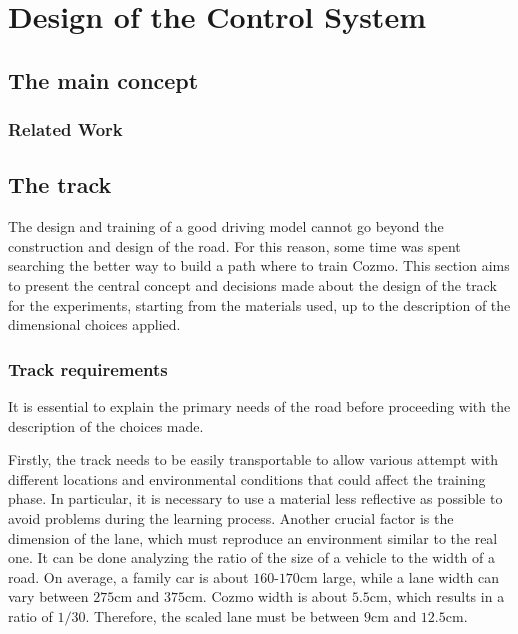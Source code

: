 \chapter{Design of the Control System}



\section{The main concept}



\subsection{Related Work}



\section{The track}

The design and training of a good driving model cannot go beyond the construction and design of the road. For this reason, some time was spent searching the better way to build a path where to train Cozmo.
This section aims to present the central concept and decisions made about the design of the track for the experiments, starting from the materials used, up to the description of the dimensional choices applied.

\subsection{Track requirements}

It is essential to explain the primary needs of the road before proceeding with the description of the choices made.

Firstly, the track needs to be easily transportable to allow various attempt with different locations and environmental conditions that could affect the training phase. In particular, it is necessary to use a material less reflective as possible to avoid problems during the learning process.
Another crucial factor is the dimension of the lane, which must reproduce an environment similar to the real one. It can be done analyzing the ratio of the size of a vehicle to the width of a road. On average, a family car is about $160$-$170$cm large, while a lane width can vary between $275$cm and $375$cm. Cozmo width is about $5.5$cm, which results in a ratio of $1/30$. Therefore, the scaled lane must be between $9$cm and $12.5$cm.

